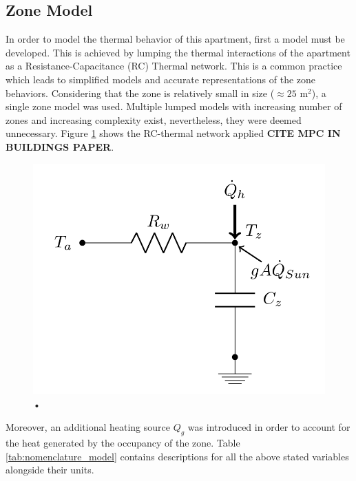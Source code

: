 \subsection{Zone Model}
\label{subsec:zone_model}
In order to model the thermal behavior of this apartment, first a model must be developed. This is achieved by lumping the thermal interactions of the apartment as a Resistance-Capacitance (RC) Thermal network. This is a common practice which leads to simplified models and accurate representations of the zone behaviors. Considering that the zone is relatively small in size ($\approx25$ m$^2$), a single zone model was used. Multiple lumped models with increasing number of zones and increasing complexity exist, nevertheless, they were deemed unnecessary. Figure \ref{fig:single_zone} shows the RC-thermal network applied \textbf{CITE MPC IN BUILDINGS PAPER}.

\begin{figure}[H]
\centering
\includegraphics[scale=0.5]{images/single_zone.png}
\caption{•}
\label{fig:single_zone}
\end{figure}

Moreover, an additional heating source $Q_g$ was introduced in order to account for the heat generated by the occupancy of the zone. Table \ref{tab:nomenclature_model} contains descriptions for all the above stated variables alongside their units.

